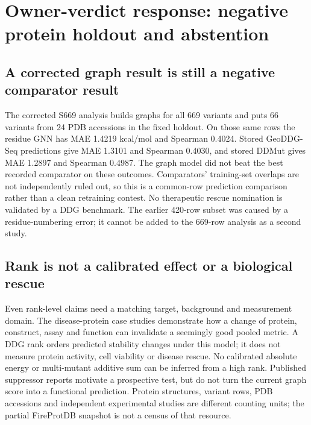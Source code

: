 \clearpage
\section{Owner-verdict response: negative protein holdout and abstention}
\subsection{A corrected graph result is still a negative comparator result}
The corrected S669 analysis builds graphs for all 669 variants and puts 66 variants from 24 PDB accessions in the fixed holdout. On those same rows the residue GNN has MAE 1.4219 kcal/mol and Spearman 0.4024. Stored GeoDDG-Seq predictions give MAE 1.3101 and Spearman 0.4030, and stored DDMut gives MAE 1.2897 and Spearman 0.4987. The graph model did not beat the best recorded comparator on these outcomes. Comparators' training-set overlaps are not independently ruled out, so this is a common-row prediction comparison rather than a clean retraining contest. No therapeutic rescue nomination is validated by a DDG benchmark. The earlier 420-row subset was caused by a residue-numbering error; it cannot be added to the 669-row analysis as a second study.

\subsection{Rank is not a calibrated effect or a biological rescue}
Even rank-level claims need a matching target, background and measurement domain. The disease-protein case studies demonstrate how a change of protein, construct, assay and function can invalidate a seemingly good pooled metric. A DDG rank orders predicted stability changes under this model; it does not measure protein activity, cell viability or disease rescue. No calibrated absolute energy or multi-mutant additive sum can be inferred from a high rank. Published suppressor reports motivate a prospective test, but do not turn the current graph score into a functional prediction. Protein structures, variant rows, PDB accessions and independent experimental studies are different counting units; the partial FireProtDB snapshot is not a census of that resource.

